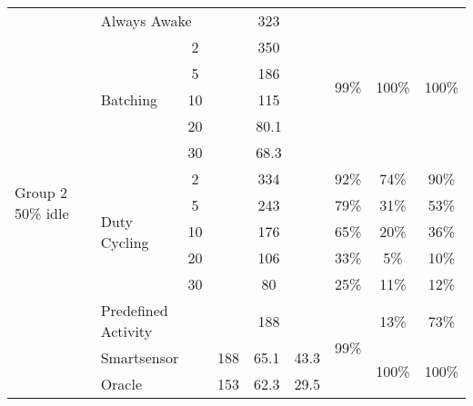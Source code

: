 \begin{table*}
{\begin{tabular}{|l|l|c|c|c|c|c|c|c|}
	\multirow{14}{*}{\parbox{1.2cm}{Group 2 50\% idle}}	& \multicolumn{2}{l|}{Always Awake}						& \multicolumn{3}{c|}{323}				& \multirow{6}{*}{99\%}	& \multirow{6}{*}{100\%}	& \multirow{6}{*}{100\%}	\\ \cline{2-6}
								& \multirow{5}{*}{Batching}		& 2						& \multicolumn{3}{c|}{350}				&						&							&							\\ \cline{3-6}
								& 								& 5						& \multicolumn{3}{c|}{186}				&						&							&							\\ \cline{3-6}
								& 								& 10					& \multicolumn{3}{c|}{115}				&						&							&							\\ \cline{3-6}
								& 								& 20					& \multicolumn{3}{c|}{80.1}				&						&							&							\\ \cline{3-6}
								& 								& 30					& \multicolumn{3}{c|}{68.3}				&						&							&							\\ \cline{2-9}
								& \multirow{5}{*}{Duty Cycling}	& 2						& \multicolumn{3}{c|}{334}				& 92\%					& 74\%						& 90\%						\\ \cline{3-9}
								& 								& 5						& \multicolumn{3}{c|}{243}				& 79\%					& 31\%						& 53\%						\\ \cline{3-9}
								& 								& 10					& \multicolumn{3}{c|}{176}				& 65\%					& 20\%						& 36\%						\\ \cline{3-9}
								& 								& 20					& \multicolumn{3}{c|}{106}				& 33\%					& 5\%						& 10\%						\\ \cline{3-9}
								& 								& 30					& \multicolumn{3}{c|}{80}				& 25\%					& 11\%						& 12\%						\\ \cline{2-9}
								& \multicolumn{2}{l|}{Predefined Activity}				& \multicolumn{3}{c|}{188}				& \multirow{3}{*}{99\%}	& 13\%						& 73\%						\\ \cline{2-6}\cline{8-9}
								& \multicolumn{2}{l|}{Smartsensor}						& 188		& 65.1		& 43.3			& 						& \multirow{2}{*}{100\%}	& \multirow{2}{*}{100\%}	\\ \cline{2-6}
								& \multicolumn{2}{l|}{Oracle}							& 153		& 62.3		& 29.5			& 						& 							& 							\\ \hline \hline


\end{tabular}}
\end{table*}
